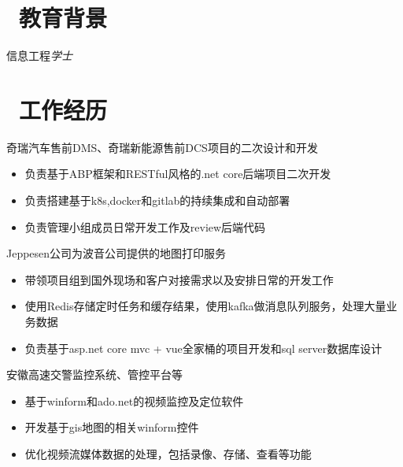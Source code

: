 \documentclass{resume}
\begin{document}
\section{\faGraduationCap\  教育背景}
信息工程\textit{学士}

\section{\faUsers\  工作经历}

奇瑞汽车售前DMS、奇瑞新能源售前DCS项目的二次设计和开发
\begin{onehalfspacing}
\begin{itemize}
  \item 负责基于ABP框架和RESTful风格的.net core后端项目二次开发
  \item 负责搭建基于k8s,docker和gitlab的持续集成和自动部署
  \item 负责管理小组成员日常开发工作及review后端代码
\end{itemize}
\end{onehalfspacing}


Jeppesen公司为波音公司提供的地图打印服务
\begin{onehalfspacing}
\begin{itemize}
  \item 带领项目组到国外现场和客户对接需求以及安排日常的开发工作
  \item 使用Redis存储定时任务和缓存结果，使用kafka做消息队列服务，处理大量业务数据
  \item 负责基于asp.net core mvc + vue全家桶的项目开发和sql server数据库设计
\end{itemize}
\end{onehalfspacing}


安徽高速交警监控系统、管控平台等
\begin{onehalfspacing}
\begin{itemize}
  \item 基于winform和ado.net的视频监控及定位软件
  \item 开发基于gis地图的相关winform控件
  \item 优化视频流媒体数据的处理，包括录像、存储、查看等功能
\end{itemize}
\end{onehalfspacing}
\end{document}

